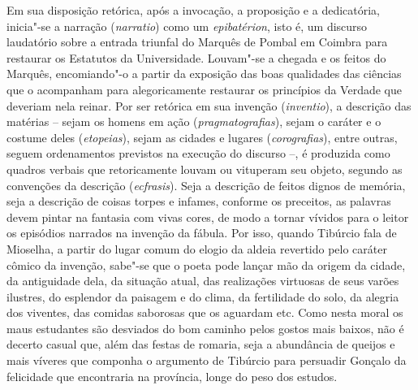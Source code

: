 Em sua disposição retórica, após a invocação, a proposição e a dedicatória,
inicia"-se a narração (\textit{narratio}) como um \textit{epibatérion}, isto é,
um discurso laudatório sobre a entrada triunfal do Marquês de Pombal em Coimbra
para restaurar os Estatutos da Universidade.  Louvam"-se a chegada e os feitos do
Marquês, encomiando"-o a partir da exposição das boas qualidades das ciências que
o acompanham para alegoricamente restaurar os princípios da Verdade que deveriam
nela reinar. Por ser retórica em sua invenção (\textit{inventio}), a descrição
das matérias -- sejam os homens em ação (\textit{pragmatografias}), sejam o
caráter e o costume deles (\textit{etopeias}), sejam as cidades e lugares
(\textit{corografias}), entre outras, seguem ordenamentos previstos na execução
do discurso --, é produzida como quadros verbais que retoricamente louvam ou
vituperam seu objeto, segundo as convenções da descrição (\textit{ecfrasis}).
Seja a descrição de feitos dignos de memória, seja a descrição de coisas torpes
e infames, conforme os preceitos, as palavras devem pintar na fantasia com vivas
cores, de modo a tornar vívidos para o leitor os episódios narrados na invenção
da fábula.  Por isso, quando Tibúrcio fala de Mioselha, a partir do lugar comum
do elogio da aldeia revertido pelo caráter cômico da invenção, sabe"-se que o
poeta pode lançar mão da origem da cidade, da antiguidade dela, da situação
atual, das realizações virtuosas de seus varões ilustres, do esplendor da
paisagem e do clima, da fertilidade do solo, da alegria dos viventes, das
comidas saborosas que os aguardam etc. Como nesta moral os maus estudantes são
desviados do bom caminho pelos gostos mais baixos, não é decerto casual que, além
das festas de romaria, seja a abundância de queijos e mais víveres que componha
o argumento de Tibúrcio para persuadir Gonçalo da felicidade que encontraria na
província, longe do peso dos estudos.

